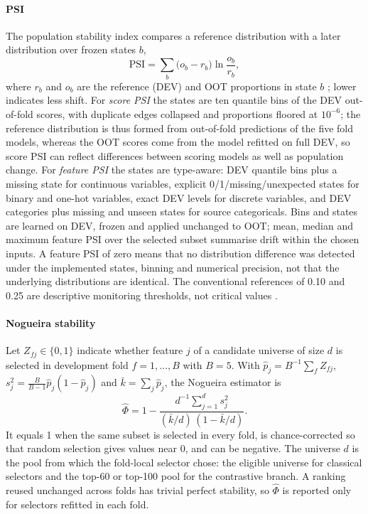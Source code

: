 \documentclass[final,5p,twocolumn]{elsarticle}
\newcommand{\PSI}{\mathrm{PSI}}
\begin{document}
\paragraph{PSI}
The population stability index compares a reference distribution with a later distribution over frozen states $b$,
\begin{equation}
    \PSI=\sum_{b}\big(o_b-r_b\big)\ln\frac{o_b}{r_b},
    \label{eq:psi}
\end{equation}
where $r_b$ and $o_b$ are the reference (DEV) and OOT proportions in state $b$ \cite{siddiqi2006,yurdakul2020}; lower indicates less shift. For \emph{score PSI} the states are ten quantile bins of the DEV out-of-fold scores, with duplicate edges collapsed and proportions floored at $10^{-6}$; the reference distribution is thus formed from out-of-fold predictions of the five fold models, whereas the OOT scores come from the model refitted on full DEV, so score PSI can reflect differences between scoring models as well as population change. For \emph{feature PSI} the states are type-aware: DEV quantile bins plus a missing state for continuous variables, explicit 0/1/missing/unexpected states for binary and one-hot variables, exact DEV levels for discrete variables, and DEV categories plus missing and unseen states for source categoricals. Bins and states are learned on DEV, frozen and applied unchanged to OOT; mean, median and maximum feature PSI over the selected subset summarise drift within the chosen inputs. A feature PSI of zero means that no distribution difference was detected under the implemented states, binning and numerical precision, not that the underlying distributions are identical. The conventional references of 0.10 and 0.25 are descriptive monitoring thresholds, not critical values \cite{yurdakul2020}.

\paragraph{Nogueira stability}
Let $Z_{fj}\in\{0,1\}$ indicate whether feature $j$ of a candidate universe of size $d$ is selected in development fold $f=1,\dots,B$ with $B=5$. With $\hat p_j=B^{-1}\sum_f Z_{fj}$, $s_j^2=\frac{B}{B-1}\hat p_j(1-\hat p_j)$ and $\bar k=\sum_j \hat p_j$, the Nogueira estimator is \cite{nogueira2018}
\begin{equation}
    \hat\Phi=1-\frac{d^{-1}\sum_{j=1}^{d}s_j^2}{(\bar k/d)\,(1-\bar k/d)} .
    \label{eq:nogueira}
\end{equation}
It equals 1 when the same subset is selected in every fold, is chance-corrected so that random selection gives values near 0, and can be negative. The universe $d$ is the pool from which the fold-local selector chose: the eligible universe for classical selectors and the top-60 or top-100 pool for the contrastive branch. A ranking reused unchanged across folds has trivial perfect stability, so $\hat\Phi$ is reported only for selectors refitted in each fold.
\end{document}
